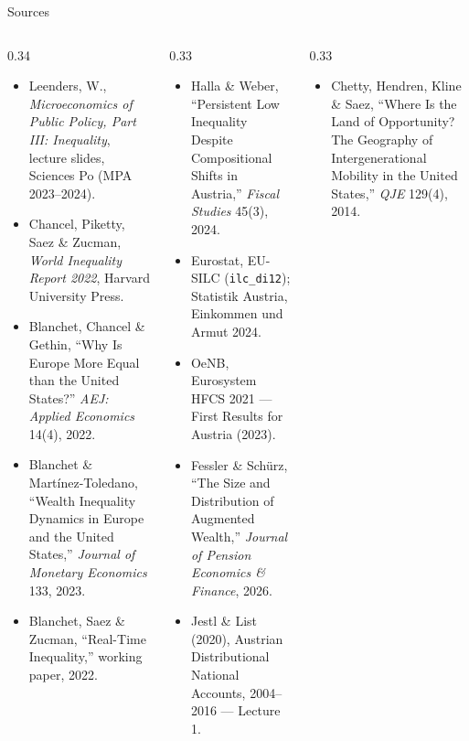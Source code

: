 \documentclass[11pt,aspectratio=169]{beamer}
\begin{document}
\begin{frame}{Sources}
  \tiny
  \begin{columns}[T]
    \begin{column}{0.34\textwidth}
      \begin{itemize}
      \setlength{\itemsep}{3pt}
        \item Leenders, W., \emph{Microeconomics of Public Policy, Part III: Inequality}, lecture slides, Sciences Po (MPA 2023--2024).
        \item Chancel, Piketty, Saez \& Zucman, \emph{World Inequality Report 2022}, Harvard University Press.
        \item Blanchet, Chancel \& Gethin, ``Why Is Europe More Equal than the United States?'' \emph{AEJ: Applied Economics} 14(4), 2022.
        \item Blanchet \& Martínez-Toledano, ``Wealth Inequality Dynamics in Europe and the United States,'' \emph{Journal of Monetary Economics} 133, 2023.
        \item Blanchet, Saez \& Zucman, ``Real-Time Inequality,'' working paper, 2022.
      \end{itemize}
    \end{column}
    \begin{column}{0.33\textwidth}
      \begin{itemize}
      \setlength{\itemsep}{3pt}
        \item Halla \& Weber, ``Persistent Low Inequality Despite Compositional Shifts in Austria,'' \emph{Fiscal Studies} 45(3), 2024.
        \item Eurostat, EU-SILC (\texttt{ilc\_di12}); Statistik Austria, Einkommen und Armut 2024.
        \item OeNB, Eurosystem HFCS 2021 --- First Results for Austria (2023).
        \item Fessler \& Schürz, ``The Size and Distribution of Augmented Wealth,'' \emph{Journal of Pension Economics \& Finance}, 2026.
        \item Jestl \& List (2020), Austrian Distributional National Accounts, 2004--2016 --- Lecture 1.
      \end{itemize}
    \end{column}
    \begin{column}{0.33\textwidth}
      \begin{itemize}
      \setlength{\itemsep}{3pt}
        \item Chetty, Hendren, Kline \& Saez, ``Where Is the Land of Opportunity? The Geography of Intergenerational Mobility in the United States,'' \emph{QJE} 129(4), 2014.

\end{itemize}
\end{column}
\end{columns}
\end{frame}
\end{document}
